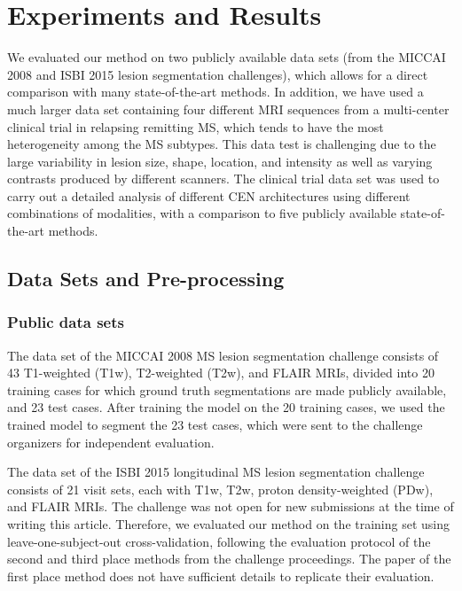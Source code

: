 \section{Experiments and Results}


We evaluated our method on two publicly available data sets (from the MICCAI
2008 and ISBI 2015 lesion segmentation challenges), which allows for a direct
comparison with many state-of-the-art methods. In addition, we have used a much
larger data set containing four different MRI sequences from a multi-center
clinical trial in relapsing remitting MS, which tends to have the most
heterogeneity among the MS subtypes. This data test is challenging due to the
large variability in lesion size, shape, location, and intensity as well as
varying contrasts produced by different scanners. The clinical trial data set
was used to carry out a detailed analysis of different CEN architectures using
different combinations of modalities, with a comparison to five publicly
available state-of-the-art methods.

\subsection{Data Sets and Pre-processing}

\subsubsection{Public data sets}
The data set of the MICCAI 2008 MS lesion segmentation challenge
\cite{styner20083d} consists of 43 T1-weighted (T1w), T2-weighted (T2w), and
FLAIR MRIs, divided into 20 training cases for which ground truth segmentations
are made publicly available, and 23 test cases. After training the model on the
20 training cases, we used the trained model to segment the 23 test cases, which
were sent to the challenge organizers for independent evaluation.

The data set of the ISBI 2015 longitudinal MS lesion segmentation challenge
consists of 21 visit sets, each with T1w, T2w, proton density-weighted (PDw),
and FLAIR MRIs. The challenge was not open for new submissions at the time of
writing this article. Therefore, we evaluated our method on the training set
using leave-one-subject-out cross-validation, following the evaluation protocol
of the second \cite{jesson2015} and third place \cite{maier2015} methods from
the challenge proceedings. The paper of the first place method does not have
sufficient details to replicate their evaluation.


